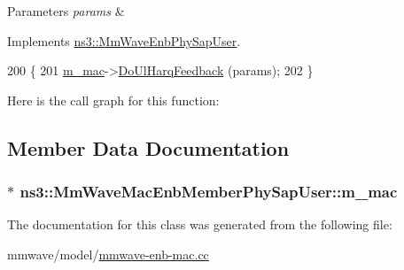 \begin{DoxyParams}{Parameters}
{\em params} & \\
\hline
\end{DoxyParams}


Implements \hyperlink{classns3_1_1MmWaveEnbPhySapUser_a260878e10f22889f4fbea4fb6210e402}{ns3\+::\+Mm\+Wave\+Enb\+Phy\+Sap\+User}.


\begin{DoxyCode}
200 \{
201   \hyperlink{classns3_1_1MmWaveMacEnbMemberPhySapUser_a567d4180e5f9172eafee3f171c9ddfe8}{m\_mac}->\hyperlink{classns3_1_1MmWaveEnbMac_a01c9f1f0d631d8ab6e200befa64cd152}{DoUlHarqFeedback} (params);
202 \}
\end{DoxyCode}


Here is the call graph for this function\+:




\subsection{Member Data Documentation}
\subsubsection[{\texorpdfstring{m\+\_\+mac}{m_mac}}]{$\ast$ ns3\+::\+Mm\+Wave\+Mac\+Enb\+Member\+Phy\+Sap\+User\+::m\+\_\+mac\hspace{0.3cm}{\ttfamily [private]}}\hypertarget{classns3_1_1MmWaveMacEnbMemberPhySapUser_a567d4180e5f9172eafee3f171c9ddfe8}{}\label{classns3_1_1MmWaveMacEnbMemberPhySapUser_a567d4180e5f9172eafee3f171c9ddfe8}


The documentation for this class was generated from the following file\+:\begin{DoxyCompactItemize}
\item 
mmwave/model/\hyperlink{mmwave-enb-mac_8cc}{mmwave-\/enb-\/mac.\+cc}\end{DoxyCompactItemize}
